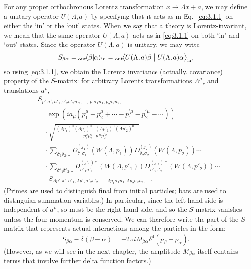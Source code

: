 For any proper orthochronous Lorentz transformation $x\to\Lambda x+a$, we may
define a unitary operator $U(\Lambda,a)$ by specifying that it acts as in
Eq.~\eqref{eq:3.1.1} on either the `in' or the `out' states. When we say that a theory is
Lorentz-invariant, we mean that the same operator $U(\Lambda,a)$ acts as in
\eqref{eq:3.1.1} on both `in' and `out' states. Since the operator $U(\Lambda,a)$ is
unitary, we may write
\[
S_{\beta\alpha}={}_{\mathrm{out}}\!\langle \beta | \alpha\rangle_{\mathrm{in}}
={}_{\mathrm{out}}\!\big\langle U(\Lambda,a)\beta\bigm|
U(\Lambda,a)\alpha\big\rangle_{\mathrm{in}},
\]
so using \eqref{eq:3.1.1}, we obtain the Lorentz invariance (actually, covariance)
property of the $S$-matrix: for arbitrary Lorentz transformations
$\Lambda^\mu{}_{\nu}$ and translations $a^\mu$,
\begin{align}
&S_{p'_1\sigma'_1n'_1;p'_2\sigma'_2n'_2;\ldots,\,
p_1\sigma_1n_1;p_2\sigma_2n_2;\ldots}
\nonumber\\
&=\exp\!\left(ia_\mu(p_1^\mu+p_2^\mu+\cdots-p_1^{\prime\mu}-p_2^{\prime\mu}-\cdots)\right)
\nonumber\\
&\quad\cdot\sqrt{\frac{(\Lambda p_1)^0(\Lambda p_2)^0\cdots
(\Lambda p'_1)^0(\Lambda p'_2)^0\cdots}
{p_1^0p_2^0\cdots p_1^{\prime0}p_2^{\prime0}\cdots}}
\nonumber\\
&\quad\cdot\sum_{\bar\sigma_1\bar\sigma_2\ldots}
D^{(j_1)}_{\bar\sigma_1\sigma_1}\!\left(W(\Lambda,p_1)\right)
D^{(j_2)}_{\bar\sigma_2\sigma_2}\!\left(W(\Lambda,p_2)\right)\cdots
\nonumber\\
&\quad\cdot\sum_{\bar\sigma'_1\bar\sigma'_2\ldots}
D^{(j'_1)*}_{\bar\sigma'_1\sigma'_1}\!\left(W(\Lambda,p'_1)\right)
D^{(j'_2)*}_{\bar\sigma'_2\sigma'_2}\!\left(W(\Lambda,p'_2)\right)\cdots
\nonumber\\
&\quad\cdot S_{\Lambda p'_1\bar\sigma'_1n'_1;\Lambda p'_2\bar\sigma'_2n'_2;\ldots,\,
\Lambda p_1\bar\sigma_1n_1;\Lambda p_2\bar\sigma_2n_2;\ldots}.
\tag{3.3.1}\label{eq:3.3.1}
\end{align}
(Primes are used to distinguish final from initial particles; bars are used to
distinguish summation variables.) In particular, since the left-hand side is
independent of $a^\mu$, so must be the right-hand side, and so the $S$-matrix
vanishes unless the four-momentum is conserved. We can therefore write the part
of the $S$-matrix that represents actual interactions among the particles in the
form:
\begin{equation}
S_{\beta\alpha}-\delta(\beta-\alpha)
=-2\pi iM_{\beta\alpha}\delta^4(p_\beta-p_\alpha).
\tag{3.3.2}\label{eq:3.3.2}
\end{equation}
(However, as we will see in the next chapter, the amplitude $M_{\beta\alpha}$
itself contains terms that involve further delta function factors.)

